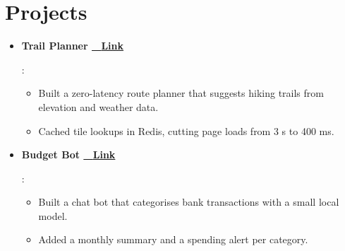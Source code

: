 \documentclass[letterpaper,11pt]{article}
\newcommand{\resumeItem}[2]{
  \item\small{
    \textbf{#1}{: #2 \vspace{-2pt}}
  }
}
\newcommand{\resumeSubItem}[2]{\resumeItem{#1}{#2}\vspace{-4pt}}
\newcommand{\resumeSubHeadingListStart}{\begin{itemize}[leftmargin=*]}
\newcommand{\resumeSubHeadingListEnd}{\end{itemize}}
\begin{document}
\section{Projects}
  \resumeSubHeadingListStart
    \resumeSubItem{Trail Planner \href{https://github.com/example/trail-planner}{\textbar\ \textbf{\color{blue} Link}}}{
         \vspace{-3pt}\begin{itemize}[topsep=0pt]
           \item Built a zero-latency route planner that suggests hiking trails from elevation and weather data.
           \item Cached tile lookups in Redis, cutting page loads from 3 s to 400 ms.
         \end{itemize}
       }

    \resumeSubItem{Budget Bot \href{https://github.com/example/budget-bot}{\textbar\ \textbf{\color{blue} Link}}}{
      \vspace{-3pt}\begin{itemize}[topsep=0pt]
        \item Built a chat bot that categorises bank transactions with a small local model.
        \item Added a monthly summary and a spending alert per category.
      \end{itemize}
    }
  \resumeSubHeadingListEnd

\end{document}
